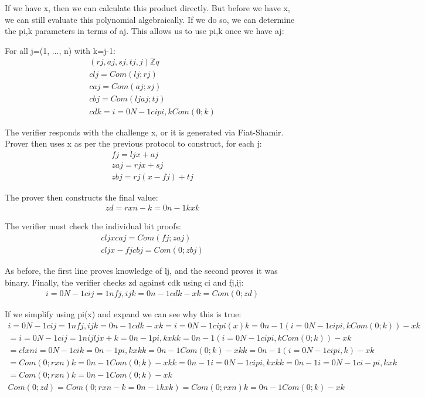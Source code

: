 \documentclass{article}
\begin{document}
If we have x, then we can calculate this product directly.  But before we have x, we can still evaluate this polynomial algebraically.  If we do so, we can determine the pi,k parameters in terms of aj.  This allows us to use pi,k once we have aj:

For all j=(1, ..., n) with k=j-1:
\begin{align}
  (rj,aj,sj,tj,j) \mathbb{Z}q\\
  clj=Com(lj;rj)\\
  caj=Com(aj;sj)\\
  cbj=Com(ljaj;tj)\\
  cdk=i=0N-1cipi,k Com(0;k)
\end{align}

The verifier responds with the challenge x, or it is generated via Fiat-Shamir.  Prover then uses x as per the previous protocol to construct, for each j:
\begin{align}
  fj=ljx+aj\\
  zaj=rjx+sj\\
  zbj=rj(x-fj)+tj
\end{align}

The prover then constructs the final value:
\begin{align}
  zd=rxn-k=0n-1kxk
\end{align}

The verifier must check the individual bit proofs:
\begin{align}
  cljx caj=Com(fj;zaj)\\
  cljx-fjcbj=Com(0;zbj)
\end{align}
    
As before, the first line proves knowledge of lj, and the second proves it was binary.  Finally, the verifier checks zd against cdk using ci and fj,ij:
\begin{align}
  i=0N-1cij=1nfj,ij  k=0n-1cdk-xk=Com(0;zd)
\end{align}

If we simplify using pi(x) and expand we can see why this is true:
\begin{align}
  i=0N-1cij=1nfj,ij  k=0n-1cdk-xk=i=0N-1cipi(x)  k=0n-1 (i=0N-1cipi,k Com(0;k))-xk\\
  =i=0N-1cij=1nijljx+ k=0n-1pi,k xk  k=0n-1 (i=0N-1cipi,k Com(0;k))-xk\\
  =clxn i=0N-1cik=0n-1pi,k xk  k=0n-1Com(0;k)-xk k=0n-1(i=0N-1cipi,k)-xk\\
  =Com(0;rxn) k=0n-1Com(0;k)-xk  k=0n-1i=0N-1cipi,k xk  k=0n-1i=0N-1ci-pi,kxk\\
  =Com(0;rxn) k=0n-1Com(0;k)-xk\\
  Com(0;zd)=Com(0;rxn-k=0n-1kxk)=Com(0;rxn) k=0n-1Com(0;k)-xk
\end{align}
\end{document}
